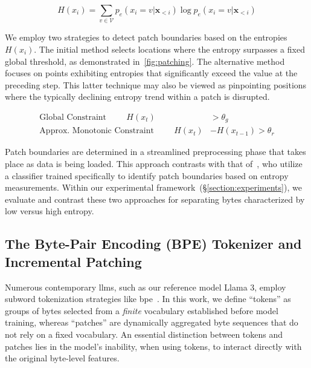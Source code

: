 \begin{equation}
H(x_i) = \sum_{v \in \mathcal{V}} p_{e}(x_i=v|\pmb{x}_{<i}) \log p_{e}(x_i=v|\pmb{x}_{<i})
\end{equation}

We employ two strategies to detect patch boundaries based on the entropies $H(x_i)$. The initial method selects locations where the entropy surpasses a fixed global threshold, as demonstrated in~\autoref{fig:patching}. The alternative method focuses on points exhibiting entropies that significantly exceed the value at the preceding step. This latter technique may also be viewed as pinpointing positions where the typically declining entropy trend within a patch is disrupted.

\begin{align*}
    \text{Global Constraint}\hspace{1cm}H(x_t)& > \theta_g\\
    \text{Approx. Monotonic Constraint}\hspace{1cm}H(x_t)& - H(x_{t-1}) > \theta_r
\end{align*}

Patch boundaries are determined in a streamlined preprocessing phase that takes place as data is being loaded. This approach contrasts with that of~\citet{nawrot-etal-2023-efficient}, who utilize a classifier trained specifically to identify patch boundaries based on entropy measurements. Within our experimental framework~(\S\ref{section:experiments}), we evaluate and contrast these two approaches for separating bytes characterized by low versus high entropy.

\subsection{The Byte-Pair Encoding (BPE) Tokenizer and Incremental Patching}
\label{section:incremental-patching}
\label{section:bpe-patch}

Numerous contemporary llms, such as our reference model Llama 3, employ subword tokenization strategies like bpe~\citep{gage1994new, sennrich-etal-2016-neural}. In this work, we define ``tokens'' as groups of bytes selected from a \textit{finite} vocabulary established before model training, whereas ``patches'' are dynamically aggregated byte sequences that do not rely on a fixed vocabulary. An essential distinction between tokens and patches lies in the model's inability, when using tokens, to interact directly with the original byte-level features.

